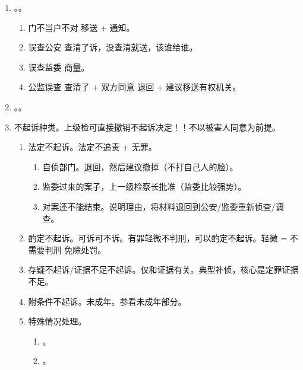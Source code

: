 \begin{enumerate}
\begin{enumerate}
\begin{enumerate}
                \end{enumerate}
          \item {}。。
                \begin{enumerate}
                  \item 门不当户不对 \yjt 移送 + 通知。
                  \item 误查公安 \yjt 查清了诉，没查清就送，该谁给谁。
                  \item 误查监委 \yjt 商量。
                  \item 公监误查 \yjt 查清了 + 双方同意 \yjt 退回 + 建议移送有权机关。
                \end{enumerate}
          \item {}。。
          \item 不起诉种类。上级检可直接撤销不起诉决定！！不以被害人同意为前提。
                \begin{enumerate}
                  \item 法定不起诉。法定不追责 + 无罪。
                        \begin{enumerate}
                          \item 自侦部门。退回，然后建议撤掉（不打自己人的脸）。
                          \item 监委过来的案子，上一级检察长批准（监委比较强势）。
                          \item 对案还不能结束。说明理由，将材料退回到公安/监委重新侦查/调查。
                        \end{enumerate}
                  \item 酌定不起诉。可诉可不诉。有罪轻微不判刑，可以酌定不起诉。轻微 = 不需要判刑 \hz 免除处罚。
                  \item 存疑不起诉/证据不足不起诉。仅和证据有关。典型补侦，核心是定罪证据不足。
                  \item 附条件不起诉。未成年。参看未成年部分。
                  \item 特殊情况处理。
                        \begin{enumerate}
                          \item {}。
                          \item {}。
                        \end{enumerate}

\end{enumerate}
\end{enumerate}
\end{enumerate}
